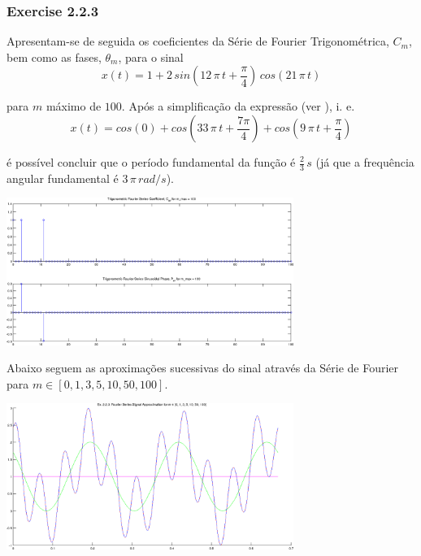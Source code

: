 \documentclass[a4paper]{article}
\begin{document}
\subsubsection{Exercise 2.2.3}
\label{subsubsec:ex_2_2_3}
\noindent Apresentam-se de seguida os coeficientes da Série de Fourier Trigonométrica, $C_m$, bem como as fases, $\theta_m$, para o sinal
\[
	x(t) = 1 + 2 \, sin\left(12 \, \pi \, t + \frac{\pi}{4}\right) \, cos(21 \, \pi \, t)
\]

\noindent para $m$ máximo de $100$. Após a simplificação da expressão (ver \emph{}), i. e.
\[
	x(t) = cos(0) + cos\left(33 \, \pi \, t + \frac{7 \pi}{4}\right) + cos\left(9 \, \pi \, t + \frac{\pi}{4}\right)
\]

\noindent é possível concluir que o período fundamental da função é $\frac{2}{3} \, s$ (já que a frequência angular fundamental é $3 \, \pi \, rad/s$).

\begin{center}
	\includegraphics[width=0.70\textwidth]{images/ex2_2_3_cm_tm.png}
	\label{fig:ex2_2_3_cm_tm}
\end{center}

\noindent Abaixo seguem as aproximações sucessivas do sinal através da Série de Fourier para $m \in [0, 1, 3, 5, 10, 50, 100]$.
\begin{center}
	\includegraphics[width=0.70\textwidth]{images/ex2_2_3_approx.png}
	\label{fig:ex2_2_3_approx}
\end{center}
\end{document}
